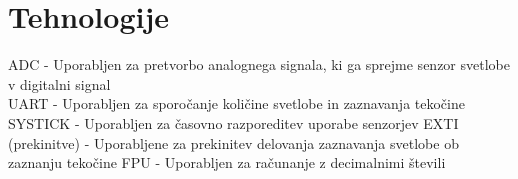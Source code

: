 \documentclass{article}
\begin{document}
\section{Tehnologije}
\noindent
ADC - Uporabljen za pretvorbo analognega signala, ki ga sprejme
senzor svetlobe v digitalni signal \\
UART - Uporabljen za sporo\v{c}anje koli\v{c}ine svetlobe in
zaznavanja teko\v{c}ine \\
SYSTICK - Uporabljen za \v{c}asovno razporeditev uporabe senzorjev
EXTI (prekinitve) - Uporabljene za prekinitev delovanja zaznavanja
svetlobe ob zaznanju teko\v{c}ine
FPU - Uporabljen za ra\v{c}unanje z decimalnimi \v{s}tevili
\end{document}
